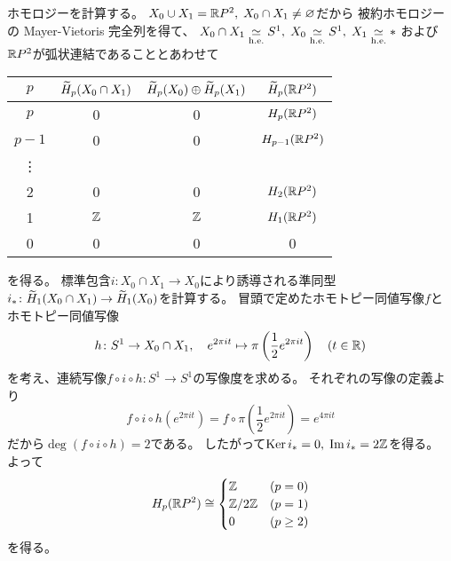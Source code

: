 \documentclass[report]{jlreq}
\begin{document}
\begin{answer}
    ホモロジーを計算する。
    $X_0 \cup X_1 = \mathbb{R} P^2, \;
        X_0 \cap X_1 \neq \varnothing$だから
    被約ホモロジーの Mayer-Vietoris 完全列を得て、
    $X_0 \cap X_1 \simeqhe S^1, \; X_0 \simeqhe S^1, \; X_1 \simeqhe *$
    および
    $\mathbb{R} P^2$が弧状連結であることとあわせて
    \begin{center}
        \begin{tabular}{c|ccc}
            $p$
                & $\widetilde{H}_p(X_0 \cap X_1)$
                & $\widetilde{H}_p(X_0) \oplus \widetilde{H}_p(X_1)$
                & $\widetilde{H}_p(\mathbb{R} P^2)$ \\
            \hline
            $p$ & 0 & 0 & $H_{p}(\mathbb{R} P^2)$ \\
            $p - 1$ & 0 & 0 & $H_{p - 1}(\mathbb{R} P^2)$ \\
            \vdots \\
            2 & 0 & 0 & $H_2(\mathbb{R} P^2)$ \\
            1 & $\mathbb{Z}$ & $\mathbb{Z}$ & $H_1(\mathbb{R} P^2)$ \\
            0 & 0 & 0 & 0
        \end{tabular}
    \end{center}
    を得る。
    標準包含$i \colon X_0 \cap X_1 \to X_0$により誘導される準同型
    $i_* \colon \widetilde{H}_1(X_0 \cap X_1) \to \widetilde{H}_1(X_0)$を計算する。
    冒頭で定めたホモトピー同値写像$f$と
    ホモトピー同値写像
    \begin{equation}
        h \colon S^1 \to X_0 \cap X_1,
            \quad
            e^{2\pi it} \mapsto \pi\left(\frac{1}{2} e^{2\pi it}\right)
            \quad (t \in \mathbb{R})
    \end{equation}
    を考え、連続写像$f \circ i \circ h \colon S^1 \to S^1$の写像度を求める。
    それぞれの写像の定義より
    \begin{equation}
        f \circ i \circ h(e^{2\pi it})
            = f \circ \pi\left(\frac{1}{2} e^{2\pi it}\right)
            = e^{4\pi it}
    \end{equation}
    だから$\deg (f \circ i \circ h) = 2$である。
    したがって$\operatorname{\mathrm{Ker}} i_* = 0, \; \operatorname{\mathrm{Im}} i_* = 2\mathbb{Z}$を得る。
    よって
    \begin{equation}
        H_p(\mathbb{R} P^2) \cong \begin{cases}
            \mathbb{Z} & (p = 0) \\
            \mathbb{Z} / 2\mathbb{Z} & (p = 1) \\
            0 & (p \ge 2)
        \end{cases}
    \end{equation}
    を得る。
\end{answer}
\end{document}
